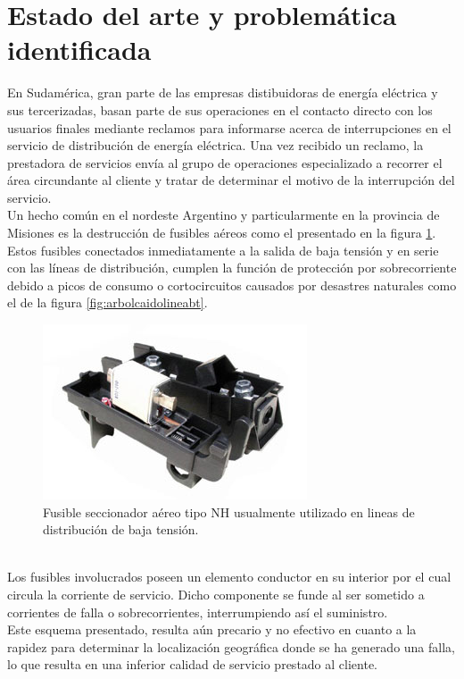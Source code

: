 \section{Estado del arte y problemática identificada}
En Sudamérica, gran parte de las empresas distibuidoras de energía eléctrica y sus tercerizadas, basan parte de sus operaciones en el contacto directo con los usuarios finales mediante reclamos para informarse acerca de interrupciones en el servicio de distribución de energía eléctrica. Una vez recibido un reclamo, la prestadora de servicios envía al grupo de operaciones especializado a recorrer el área circundante al cliente y tratar de determinar el motivo de la interrupción del servicio.\\
Un hecho común en el nordeste Argentino y particularmente en la provincia de Misiones es la destrucción de fusibles aéreos como el presentado en la figura \ref{fig:nh_aereo_bt}. Estos fusibles conectados inmediatamente a la salida de baja tensión y en serie con las líneas de distribución, cumplen la función de protección por sobrecorriente debido a picos de consumo o cortocircuitos causados por desastres naturales como el de la figura \ref{fig:arbolcaidolineabt}.\\
\begin{figure}[h!]
	\centering
	\includegraphics[width=0.7\linewidth]{Figures/NH_aereo_bt}
	\caption{Fusible seccionador aéreo tipo NH usualmente utilizado en lineas de distribución de baja tensión.}
	\label{fig:nh_aereo_bt}
\end{figure}\\
Los fusibles involucrados poseen un elemento conductor en su interior por el cual circula la corriente de servicio. Dicho componente se funde al ser sometido a corrientes de falla o sobrecorrientes, interrumpiendo así el suministro.\\
Este esquema presentado, resulta aún precario y no efectivo en cuanto a la rapidez para determinar la localización geográfica donde se ha generado una falla, lo que resulta en una inferior calidad de servicio prestado al cliente.\\

